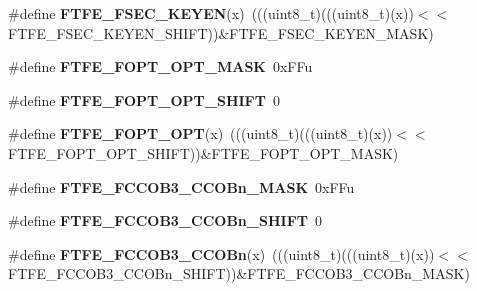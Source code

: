 \begin{DoxyCompactItemize}
\item 
\#define {\bfseries F\+T\+F\+E\+\_\+\+F\+S\+E\+C\+\_\+\+K\+E\+Y\+EN}(x)~(((uint8\+\_\+t)(((uint8\+\_\+t)(x))$<$$<$F\+T\+F\+E\+\_\+\+F\+S\+E\+C\+\_\+\+K\+E\+Y\+E\+N\+\_\+\+S\+H\+I\+FT))\&F\+T\+F\+E\+\_\+\+F\+S\+E\+C\+\_\+\+K\+E\+Y\+E\+N\+\_\+\+M\+A\+SK)\hypertarget{group__FTFE__Register__Masks_gaf3cfda2df1d49468dfe24d96469b07a3}{}\label{group__FTFE__Register__Masks_gaf3cfda2df1d49468dfe24d96469b07a3}

\item 
\#define {\bfseries F\+T\+F\+E\+\_\+\+F\+O\+P\+T\+\_\+\+O\+P\+T\+\_\+\+M\+A\+SK}~0x\+F\+Fu\hypertarget{group__FTFE__Register__Masks_gafbeb43ee4b3c54b91d39f7ac619c129f}{}\label{group__FTFE__Register__Masks_gafbeb43ee4b3c54b91d39f7ac619c129f}

\item 
\#define {\bfseries F\+T\+F\+E\+\_\+\+F\+O\+P\+T\+\_\+\+O\+P\+T\+\_\+\+S\+H\+I\+FT}~0\hypertarget{group__FTFE__Register__Masks_gaa36bd1377899a70f05455ce2b627f775}{}\label{group__FTFE__Register__Masks_gaa36bd1377899a70f05455ce2b627f775}

\item 
\#define {\bfseries F\+T\+F\+E\+\_\+\+F\+O\+P\+T\+\_\+\+O\+PT}(x)~(((uint8\+\_\+t)(((uint8\+\_\+t)(x))$<$$<$F\+T\+F\+E\+\_\+\+F\+O\+P\+T\+\_\+\+O\+P\+T\+\_\+\+S\+H\+I\+FT))\&F\+T\+F\+E\+\_\+\+F\+O\+P\+T\+\_\+\+O\+P\+T\+\_\+\+M\+A\+SK)\hypertarget{group__FTFE__Register__Masks_ga342e8cc09bf4a65b74d1db1f1cf85273}{}\label{group__FTFE__Register__Masks_ga342e8cc09bf4a65b74d1db1f1cf85273}

\item 
\#define {\bfseries F\+T\+F\+E\+\_\+\+F\+C\+C\+O\+B3\+\_\+\+C\+C\+O\+Bn\+\_\+\+M\+A\+SK}~0x\+F\+Fu\hypertarget{group__FTFE__Register__Masks_ga10bc3ec6bba0545905e9cc4c41264b67}{}\label{group__FTFE__Register__Masks_ga10bc3ec6bba0545905e9cc4c41264b67}

\item 
\#define {\bfseries F\+T\+F\+E\+\_\+\+F\+C\+C\+O\+B3\+\_\+\+C\+C\+O\+Bn\+\_\+\+S\+H\+I\+FT}~0\hypertarget{group__FTFE__Register__Masks_gad4804cedc12c2c61544737b797081590}{}\label{group__FTFE__Register__Masks_gad4804cedc12c2c61544737b797081590}

\item 
\#define {\bfseries F\+T\+F\+E\+\_\+\+F\+C\+C\+O\+B3\+\_\+\+C\+C\+O\+Bn}(x)~(((uint8\+\_\+t)(((uint8\+\_\+t)(x))$<$$<$F\+T\+F\+E\+\_\+\+F\+C\+C\+O\+B3\+\_\+\+C\+C\+O\+Bn\+\_\+\+S\+H\+I\+FT))\&F\+T\+F\+E\+\_\+\+F\+C\+C\+O\+B3\+\_\+\+C\+C\+O\+Bn\+\_\+\+M\+A\+SK)\hypertarget{group__FTFE__Register__Masks_ga0f3bd12c016c6f252723a12ae330ed91}{}\label{group__FTFE__Register__Masks_ga0f3bd12c016c6f252723a12ae330ed91}


\end{DoxyCompactItemize}
